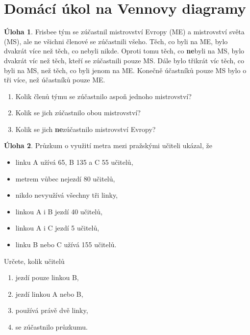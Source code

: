 \documentclass[10pt,a5paper]{article}
\def\tisk{%
\newbox\shipouthackbox
\pdfpagewidth=2\pdfpagewidth
\let\oldshipout=\shipout
\def\shipout{\afterassignment\zdvojtmp \setbox\shipouthackbox=}%
\def\zdvojtmp{\aftergroup\zdvoj}%
\def\zdvoj{%
    \oldshipout\vbox{\hbox{%
        \copy\shipouthackbox
        \hskip\dimexpr .5\pdfpagewidth-\wd\shipouthackbox\relax
        \box\shipouthackbox
    }}%
}}%
\theoremstyle{definition}
\newtheorem{uloha}{Úloha}
\begin{document}

\section*{Domácí úkol na Vennovy diagramy}


\begin{uloha}
Frisbee tým se zúčastnil mistrovství Evropy (ME) a mistrovství světa (MS), ale ne všichni členové se zúčastnili všeho. Těch, co byli na ME, bylo dvakrát více než těch, co nebyli nikde. Oproti tomu těch, co \textbf{ne}byli na MS, bylo dvakrát víc než těch, kteří se zúčastnili pouze MS. Dále bylo třikrát víc těch, co byli na MS, než těch, co byli jenom na ME. Konečně účastníků pouze MS bylo o tři více, než účastníků pouze ME.
\begin{enumerate}
    \item Kolik členů týmu se zúčastnilo aspoň jednoho mistrovství?
    \item Kolik se jich zúčastnilo obou mistrovství?
    \item Kolik se jich \textbf{ne}zúčastnilo mistrovství Evropy?
\end{enumerate}
\end{uloha}


\begin{uloha}
Průzkum o využití metra mezi pražskými učiteli ukázal, že
\begin{itemize}
    \item linku A užívá 65, B 135 a C 55 učitelů,
    \item metrem vůbec nejezdí 80 učitelů,
    \item nikdo nevyužívá všechny tři linky,
    \item linkou A i B jezdí 40 učitelů,
    \item linkou A i C jezdí 5 učitelů,
    \item linku B nebo C užívá 155 učitelů.
\end{itemize}
Určete, kolik učitelů
\begin{enumerate}
    \item jezdí pouze linkou B,
    \item jezdí linkou A nebo B,
    \item používá právě dvě linky,
    \item se zúčastnilo průzkumu.
\end{enumerate}
\end{uloha}
\end{document}
